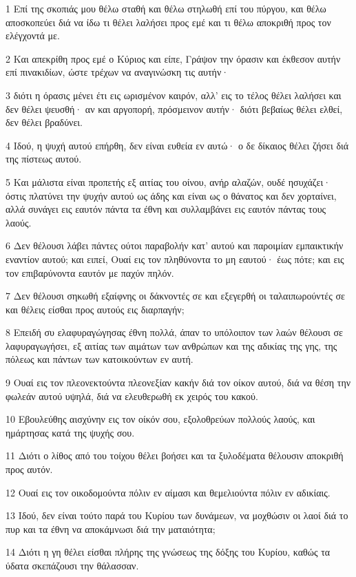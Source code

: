 \par 1 Επί της σκοπιάς μου θέλω σταθή και θέλω στηλωθή επί του πύργου, και θέλω αποσκοπεύει διά να ίδω τι θέλει λαλήσει προς εμέ και τι θέλω αποκριθή προς τον ελέγχοντά με.
\par 2 Και απεκρίθη προς εμέ ο Κύριος και είπε, Γράψον την όρασιν και έκθεσον αυτήν επί πινακιδίων, ώστε τρέχων να αναγινώσκη τις αυτήν·
\par 3 διότι η όρασις μένει έτι εις ωρισμένον καιρόν, αλλ' εις το τέλος θέλει λαλήσει και δεν θέλει ψευσθή· αν και αργοπορή, πρόσμεινον αυτήν· διότι βεβαίως θέλει ελθεί, δεν θέλει βραδύνει.
\par 4 Ιδού, η ψυχή αυτού επήρθη, δεν είναι ευθεία εν αυτώ· ο δε δίκαιος θέλει ζήσει διά της πίστεως αυτού.
\par 5 Και μάλιστα είναι προπετής εξ αιτίας του οίνου, ανήρ αλαζών, ουδέ ησυχάζει· όστις πλατύνει την ψυχήν αυτού ως άδης και είναι ως ο θάνατος και δεν χορταίνει, αλλά συνάγει εις εαυτόν πάντα τα έθνη και συλλαμβάνει εις εαυτόν πάντας τους λαούς.
\par 6 Δεν θέλουσι λάβει πάντες ούτοι παραβολήν κατ' αυτού και παροιμίαν εμπαικτικήν εναντίον αυτού; και ειπεί, Ουαί εις τον πληθύνοντα το μη εαυτού· έως πότε; και εις τον επιβαρύνοντα εαυτόν με παχύν πηλόν.
\par 7 Δεν θέλουσι σηκωθή εξαίφνης οι δάκνοντές σε και εξεγερθή οι ταλαιπωρούντές σε και θέλεις είσθαι προς αυτούς εις διαρπαγήν;
\par 8 Επειδή συ ελαφυραγώγησας έθνη πολλά, άπαν το υπόλοιπον των λαών θέλουσι σε λαφυραγωγήσει, εξ αιτίας των αιμάτων των ανθρώπων και της αδικίας της γης, της πόλεως και πάντων των κατοικούντων εν αυτή.
\par 9 Ουαί εις τον πλεονεκτούντα πλεονεξίαν κακήν διά τον οίκον αυτού, διά να θέση την φωλεάν αυτού υψηλά, διά να ελευθερωθή εκ χειρός του κακού.
\par 10 Εβουλεύθης αισχύνην εις τον οίκόν σου, εξολοθρεύων πολλούς λαούς, και ημάρτησας κατά της ψυχής σου.
\par 11 Διότι ο λίθος από του τοίχου θέλει βοήσει και τα ξυλοδέματα θέλουσιν αποκριθή προς αυτόν.
\par 12 Ουαί εις τον οικοδομούντα πόλιν εν αίμασι και θεμελιούντα πόλιν εν αδικίαις.
\par 13 Ιδού, δεν είναι τούτο παρά του Κυρίου των δυνάμεων, να μοχθώσιν οι λαοί διά το πυρ και τα έθνη να αποκάμνωσι διά την ματαιότητα;
\par 14 Διότι η γη θέλει είσθαι πλήρης της γνώσεως της δόξης του Κυρίου, καθώς τα ύδατα σκεπάζουσι την θάλασσαν.

